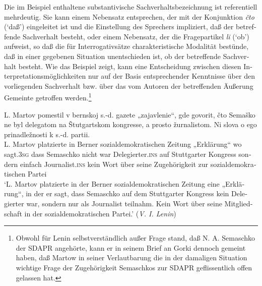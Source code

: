 \documentclass[output=paper]{langscibook}
\begin{document}
\begin{otherlanguage}{german}


\noindent Die im Beispiel  enthaltene substantivische Sachverhaltsbezeichnung ist re\-fe\-ren\-ti\-ell mehrdeutig. Sie kann einem Nebensatz entsprechen, der mit der Konjunktion \textit{čto} (‘daß’) eingeleitet ist und die Einstellung des Sprechers impliziert, daß der betreffende Sachverhalt besteht, oder einem Nebensatz, der die Fragepartikel \textit{li} (‘ob’) aufweist, so daß die für Interrogativsätze charakteristische Moda\-lität bestünde, daß in einer gegebenen Situation unentschieden ist, ob der betreffende Sachverhalt besteht. Wie das Beispiel zeigt, kann eine Entscheidung zwischen diesen Interpretationsmöglichkeiten nur auf der Basis entsprechender Kenntnisse über den vorliegenden Sachverhalt bzw. über das vom Autoren der betreffenden Äußerung Gemeinte getroffen werden.\footnote{Obwohl für Lenin selbstverständlich außer Frage stand, daß N. A. Semaschko der SDAPR angehörte, kann er in seinem Brief an Gorki dennoch gemeint haben, daß Martow in seiner Verlautbarung die in der damaligen Situation wichtige Frage der Zugehörigkeit Semaschkos zur SDAPR geflissentlich offen gelassen hat.}

\ea \label{ex:zi83:25}
    \gll L. Martov pomestil v bernskoj s.-d. gazete „zajavlenie“, gde govorit, čto Semaško ne byl delegatom na Štutgartskom kongresse, a prosto žurnalistom. Ni slova o ego prinadležnosti k s.-d. partii.  \\
    L. Martov platzierte in  Berner sozialdemokratischen Zeitung  „Erklärung“ wo sagt.3\textsc{sg} dass Semaschko nicht war  Delegierter.\textsc{ins} auf Stuttgarter Kongress sondern einfach Journalist.\textsc{ins} kein Wort über seine Zugehörigkeit zur sozialdemokratischen Partei \\
    \glt ‘L. Martov platzierte in der Berner sozialdemokratischen Zeitung eine „Erklärung“, in der er sagt, dass Semaschko auf dem Stuttgarter Kongress kein Delegierter war, sondern nur als Journalist teilnahm. Kein Wort über seine Mitgliedschaft in der sozialdemokratischen Partei.’ (\textit{V. I. Lenin})


\end{otherlanguage}
\end{document}
